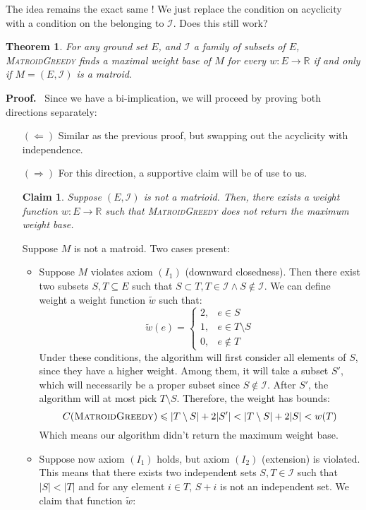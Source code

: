 \documentclass{report}
\newcommand{\RR}{\ensuremath{\mathbb{R}}}
\newcommand{\II}{\ensuremath{\mathcal{I}}}
\newcommand{\aparte}[2]{
    \vspace{0.5em}
    \begin{adjustwidth}{20pt}{0pt}
        \begin{boxxx}
            \textbf{#1.}\ #2
        \end{boxxx}
    \end{adjustwidth}
    \vspace{0.75em}
}
\newtheorem{theorem}{Theorem}
\newtheorem{claim*}{Claim}
\begin{document}
  The idea remains the exact same ! We just replace the condition on acyclicity with a condition on the belonging to $\II$. Does this still work?
  \begin{theorem}
  	For any ground set $E$, and $\II$ a family of subsets of $E$, \textsc{MatroidGreedy} finds a maximal weight base of $M$ for every $w: E \to \RR$ if and only if $M = (E, \II)$ is a matroid.
  \end{theorem}
  \aparte{Proof}{
    Since we have a bi-implication, we will proceed by proving both directions separately:

    \begin{itemize}
      \item[$(\Leftarrow)$] Similar as the previous proof, but swapping out the acyclicity with independence.
      \item[$(\Rightarrow)$] For this direction, a supportive claim will be of use to us.
        \begin{claim*}
          Suppose $(E, \II)$ is not a matrioid. Then, there exists a weight function $w: E \to \RR$ such that \textsc{MatroidGreedy} does not return the maximum weight base.
        \end{claim*}
        Suppose $M$ is not a matroid. Two cases present:
        \begin{itemize}
          \item Suppose $M$ violates axiom $(I_1)$ (downward closedness). Then there exist two subsets $S, T \subseteq E$ such that $S \subset T, T \in \II \land S \not\in \II$. We can define weight a weight function $\tilde w$ such that:
          \[
            \tilde w(e) = \begin{cases}
              2 , &e \in S \\
              1 , &e \in T \setminus S \\
              0 , &e \not\in T
            \end{cases}
          \]
          Under these conditions, the algorithm will first consider all elements of $S$, since they have a higher weight. Among them, it will take a subset $S'$, which will necessarily be a proper subset since $S \not\in \II$. After $S'$, the algorithm will at most pick $T \setminus S$. Therefore, the weight has bounds:
          \[
            C(\text{\textsc{MatroidGreedy}}) \leqslant |T \setminus S| + 2|S'| < |T \setminus S| + 2|S| < w(T)
          \]
          Which means our algorithm didn't return the maximum weight base.
          \item Suppose now axiom $(I_1)$ holds, but axiom $(I_2)$ (extension) is violated. This means that there exists two independent sets $S, T \in \II$ such that $|S| < |T|$ and for any element $i \in T$, $S + i$ is not an independent set. We claim that function $\tilde w$:

\end{itemize}
\end{itemize}}
\end{document}
